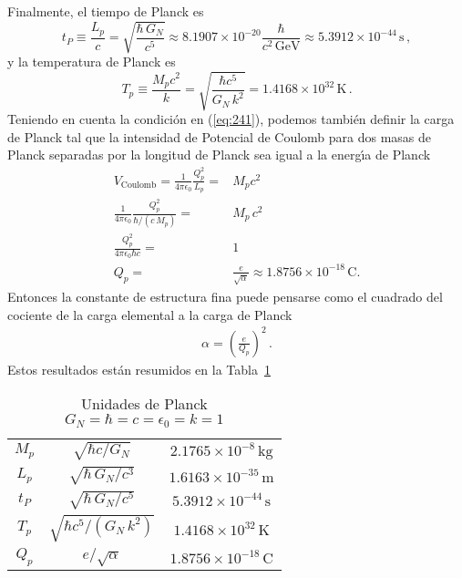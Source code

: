 Finalmente, el tiempo de Planck es
\begin{equation}
  t_P\equiv\frac{L_p}{c}=\sqrt{\frac{\hbar\, G_N}{c^5}}\approx8.1907\times10^{-20}\frac{\hbar}{c^2\,\text{GeV}}\approx5.3912\times10^{-44}\,\text{s}\,,
\end{equation}
y la temperatura de Planck es
\begin{equation}
  T_p\equiv\frac{M_p c^2}{k}=\sqrt{\frac{\hbar c^5}{G_N\,k^2}}=1.4168\times10^{32}\,\text{K}\,.
\end{equation}
Teniendo en cuenta la condici\'on en (\ref{eq:241}), podemos tambi\'en definir la carga de Planck tal que la intensidad de Potencial de Coulomb para dos masas de Planck separadas por la longitud de Planck sea igual a la energ\'\i a de Planck
\begin{align}
  V_{\text{Coulomb}}=\frac{1}{4\pi\epsilon_0}\frac{Q_p^2}{L_p}=&M_pc^2\nonumber\\
  \frac{1}{4\pi\epsilon_0}\frac{Q_p^2}{\hbar/(c\,M_p)}=&M_p\,c^2\nonumber\\
  \frac{Q_p^2}{4\pi\epsilon_0\hbar c}=&1\nonumber\\
  Q_p=&\frac{e}{\sqrt{\alpha}}\approx1.8756\times10^{-18}\,\text{C}.
\end{align}
Entonces la constante de estructura fina puede pensarse como el cuadrado del cociente de la carga elemental a la carga de Planck
\begin{align}
  \alpha=\left(\frac{e}{Q_p}\right)^2\,.
\end{align}
Estos resultados est\'an resumidos en la Tabla~\ref{tab:PU}
\begin{table} %
  \centering %
  \begin{tabular}{c|c|c} %
$M_p$&$\sqrt{\hbar c/G_N}$&$2.1765\times10^{-8}\,\text{kg}$\\
$L_p$&$\sqrt{{\hbar\, G_N}/{c^3}}$&$1.6163\times10^{-35}\,\text{m}$\\
$t_P$&$\sqrt{{\hbar\, G_N}/{c^5}}$&$5.3912\times10^{-44}\,\text{s}$\\
$T_p$&$\sqrt{{\hbar c^5}/(G_N\,k^2)}$&$1.4168\times10^{32}\,\text{K}$\\
$Q_p$&${e}/{\sqrt{\alpha}}$&$1.8756\times10^{-18}\,\text{C}$\\
  \end{tabular} %
  \caption{Unidades de Planck $G_N=\hbar=c=\epsilon_0=k=1$} %
  \label{tab:PU} %
\end{table} %

